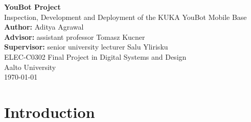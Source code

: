 \documentclass[a4paper, 12pt]{article}
\newcommand{\projectTitle}{YouBot Project}
\newcommand{\projectSubtitle}{Inspection, Development and Deployment of the KUKA YouBot Mobile Base}
\newcommand{\authorName}{Aditya Agrawal}
\newcommand{\advisorName}{assistant professor Tomasz Kucner}
\newcommand{\supervisorName}{senior university lecturer Salu Ylirisku}
\newcommand{\courseName}{ELEC-C0302 Final Project in Digital Systems and Design}
\newcommand{\universityName}{Aalto University}
\newcommand{\commentout}[1]{}
\begin{document}
    \begin{titlepage}
        \raggedright
        

        \vspace*{2cm}

        {\Huge \textbf{\projectTitle}}\\[0.5cm]
        {\Large \projectSubtitle}\\[2cm]

        \textbf{Author:} \authorName\\[0.3cm]
        \textbf{Advisor:} \advisorName\\[0.3cm]
        \textbf{Supervisor:} \supervisorName\\[2cm]

        \courseName \\
        \universityName\\[0.5cm]
        \today

        \vfill
    \end{titlepage}
    \setcounter{tocdepth}{2} %
    \romantableofcontents

    \commentout{\section{Ideas \& Drafts (NOT ON FINAL REPORT)}
    structure: 
    My work
    reflection
    appendix: user manual

    things I did i want to add:
    - add in the initial project plan
    - add in the initial state of everything
    - known documentation

    - libfreenect and kinect camera
    - communication with onboard computer
    - enabling it to initially move through provided demos
    - utilising ROS1-ROS2 bridge (fail)
    - fixing the battery up 
    - writing my own programs to move the bot 
    
    - how did my goals change with time?
    - project management brief overview
    Teach and repeat background:
    https://furgalep.github.io/bib/mcmanus_icra12.pdf
    https://www.sciencedirect.com/science/article/pii/S0921889020304176
    https://arxiv.org/pdf/2309.15405
    https://clearpathrobotics.com/blog/2018/07/visual-teach-and-repeat-closer-look-part-1/}

    
    
    \section{Introduction}
\end{document}
